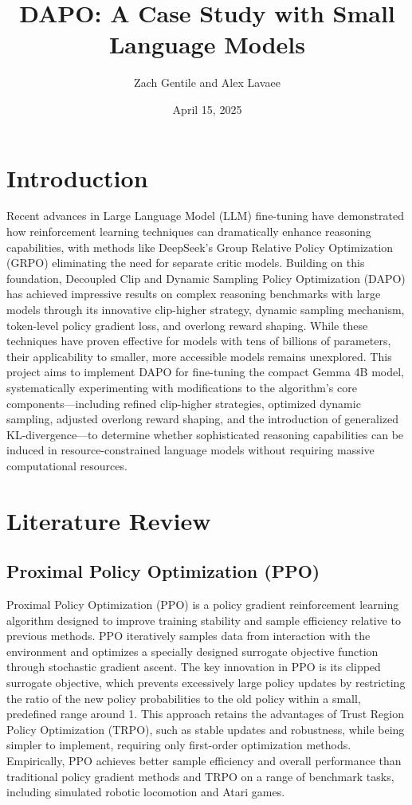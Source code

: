 \documentclass[11pt, oneside]{article}   	%
\title{DAPO: A Case Study with Small Language Models}
\author{Zach Gentile and Alex Lavaee}
\date{April 15, 2025}
\begin{document}
\maketitle

\section*{Introduction}

Recent advances in Large Language Model (LLM) fine-tuning have demonstrated how reinforcement learning techniques can dramatically enhance reasoning capabilities, with methods like DeepSeek's Group Relative Policy Optimization (GRPO) eliminating the need for separate critic models. Building on this foundation, Decoupled Clip and Dynamic Sampling Policy Optimization (DAPO) has achieved impressive results on complex reasoning benchmarks with large models through its innovative clip-higher strategy, dynamic sampling mechanism, token-level policy gradient loss, and overlong reward shaping. While these techniques have proven effective for models with tens of billions of parameters, their applicability to smaller, more accessible models remains unexplored. This project aims to implement DAPO for fine-tuning the compact Gemma 4B model, systematically experimenting with modifications to the algorithm's core components—including refined clip-higher strategies, optimized dynamic sampling, adjusted overlong reward shaping, and the introduction of generalized KL-divergence—to determine whether sophisticated reasoning capabilities can be induced in resource-constrained language models without requiring massive computational resources.

\section*{Literature Review}

\subsection*{Proximal Policy Optimization (PPO) \cite{schulman2017proximalpolicyoptimizationalgorithms}}

Proximal Policy Optimization (PPO) is a policy gradient reinforcement learning algorithm designed to improve training stability and sample efficiency relative to previous methods. PPO iteratively samples data from interaction with the environment and optimizes a specially designed surrogate objective function through stochastic gradient ascent. The key innovation in PPO is its clipped surrogate objective, which prevents excessively large policy updates by restricting the ratio of the new policy probabilities to the old policy within a small, predefined range around 1. This approach retains the advantages of Trust Region Policy Optimization (TRPO), such as stable updates and robustness, while being simpler to implement, requiring only first-order optimization methods. Empirically, PPO achieves better sample efficiency and overall performance than traditional policy gradient methods and TRPO on a range of benchmark tasks, including simulated robotic locomotion and Atari games.
\end{document}
